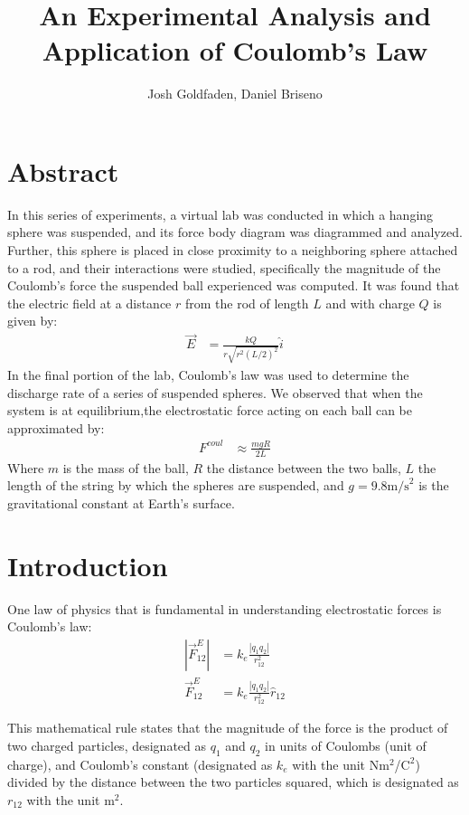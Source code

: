 \documentclass[oneside,12pt]{amsart}
\title{An Experimental Analysis and Application of Coulomb’s Law}
\author{Josh Goldfaden, Daniel Briseno}
\date{}
\begin{document}
	\maketitle
	\section{Abstract}
	In this series of experiments, a virtual lab was conducted in which a hanging sphere was suspended, and its force body diagram was diagrammed and analyzed. Further, this sphere is placed in close proximity to a neighboring sphere attached to a rod, and their interactions were studied, specifically the magnitude of the Coulomb's force the suspended ball experienced was computed. It was found that the electric field at a distance $r$ from the rod of length $L$ and with charge $Q$ is given by:
	\begin{align*}
		\vec{E} &=  \frac{kQ}{r\sqrt{r^2(L/2)^2}}\hat{i}
	\end{align*}
	In the final portion of the lab, Coulomb’s law was used to determine the discharge rate of a series of suspended spheres. We observed that when the system is at equilibrium,the electrostatic force acting on each ball can be approximated by: 
	\begin{align*}
	F^{coul} &\approx \frac{mgR}{2L}
	\end{align*}
	Where $m$ is the mass of the ball, $R$ the distance between the two balls, $L$ the length of the string by which the spheres are suspended, and $g= 9.8\text{m/s}^2$ is the gravitational constant at Earth's surface.
	\section{Introduction}
	One law of physics that is fundamental in understanding electrostatic forces is Coulomb’s law\cite{mazur_pedigo_crouch_dourmashkin_bieniek_banfi_jisrawi_setlur_2016}: 
	\begin{align}
		|\vec{F}^E_{12}| &= k_e \frac{|q_1 q_2|}{r_{12}^2}\\
		\vec{F}^E_{12} &= k_e \frac{|q_1 q_2|}{r_{12}^2} \hat{r}_{12} 
	\end{align}
	
	\indent This mathematical rule states that the magnitude of the force is the product of two charged particles, designated as $q_1$ and $q_2$ in units of Coulombs (unit of charge), and Coulomb’s constant (designated as $k_e$ with the unit N$\text{m}^2$/$\text{C}^2$) divided by the distance between the two particles squared, which is designated as $r_{12}$ with the unit $\text{m}^2$. \\ 
	
\end{document}

